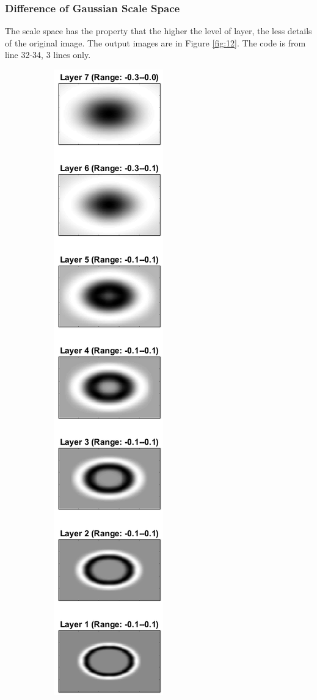 \subsubsection{Difference of Gaussian Scale Space}
The scale space has the property that the higher the level of layer, the less details of the original image.
The output images are in Figure \ref{fig:12}.
The code is from line 32-34, 3 lines only.

\begin{figure}
	\centering
	\begin{subfigure}[t]{0.4\textwidth}
	    \centering
		\includegraphics[height=0.92\textheight]{hw3/problem1/DoGSSc.png}

\end{subfigure}
\end{figure}
